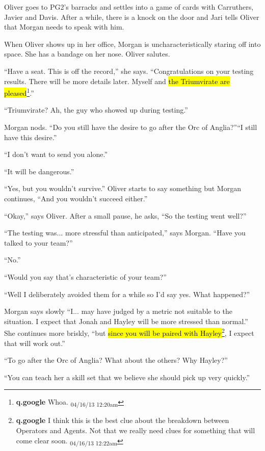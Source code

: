 
Oliver goes to PG2's barracks and settles into a game of cards with Carruthers, Javier and Davis.  After a while, there is a knock on the door and Jari tells Oliver that Morgan needs to speak with him.



When Oliver shows up in her office, Morgan is uncharacteristically staring off into space.  She has a bandage on her nose.  Oliver salutes. 



``Have a seat.  This is off the record,'' she says.  ``Congratulations on your testing results.  There will be more details later.  Myself and \hl{the Triumvirate are pleased}\footnote{\textbf{q.google }Whoa. \textsubscript{04/16/13 12:20am}}.''

``Triumvirate?  Ah, the guy who showed up during testing.''

Morgan nods.  ``Do you still have the desire to go after the Orc of Anglia?''``I still have this desire.''

``I don't want to send you alone.''

``It will be dangerous.''

``Yes, but you wouldn't survive.''  Oliver starts to say something but Morgan continues, ``And you wouldn't succeed either.''

``Okay,'' says Oliver.  After a small pause, he asks, ``So the testing went well?''

``The testing was... more stressful than anticipated,'' says Morgan. ``Have you talked to your team?''

``No.''

``Would you say that's characteristic of your team?''

``Well I deliberately avoided them for a while so I'd say yes.  What happened?''

Morgan says slowly ``I... may have judged by a metric not suitable to the situation.  I expect that Jonah and Hayley will be more stressed than normal.''  She continues more briskly, ``but \hl{since you will be paired with Hayley}\footnote{\textbf{q.google }I think this is the best clue about the breakdown between Operators and Agents.  Not that we really need clues for something that will come clear soon. \textsubscript{04/16/13 12:22am}}, I expect that will work out.''

``To go after the Orc of Anglia?  What about the others?  Why Hayley?''

``You can teach her a skill set that we believe she should pick up very quickly.''


